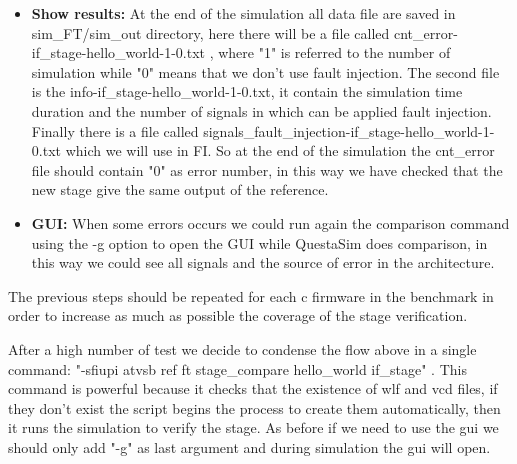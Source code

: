 {{{\begin{itemize}
                To compare the two architecture we should use
                \breakline vsim\_stage\_compare.tcl script (always located in questa directory). This script is the most complex because it contains all code to do comparison, fault injection and data saving. The behaviour is changed using some environmental variables which are set by the comp\_sim script. For the current step we use this script to simulate the new stage using the Reference Inputs as stage stimulus and to compare the simulation outputs with the Reference wlf file, all these operations can be done with the command: \breakline "-b atvsb ref ft stage\_compare hello\_world if\_stage".
                Here comp\_sim use the previous vcd and wlf file created, so if they don't exist we will have some errors.
                
                \item \textbf{Show results:} At the end of the simulation all data file are saved in sim\_FT/sim\_out directory, here there will be a file called cnt\_error-if\_stage-hello\_world-1-0.txt , where "1" is referred to the number of simulation while "0" means that we don't use fault injection. The second file is the info-if\_stage-hello\_world-1-0.txt, it contain the simulation time duration and the number of signals in which can be applied fault injection. Finally there is a file called signals\_fault\_injection-if\_stage-hello\_world-1-0.txt which we will use in FI.
                So at the end of the simulation the cnt\_error file should contain "0" as error number, in this way we have checked that the new stage give the same output of the reference.
            
                \item \textbf{GUI:} When some errors occurs we could run again the comparison command using the -g option to open the GUI while QuestaSim does comparison, in this way we could see all signals and the source of error in the architecture.         
            \end{itemize} 
            
            The previous steps should be repeated for each c firmware in the benchmark in order to increase as much as possible the coverage of the stage verification.
            
            After a high number of test we decide to condense the flow above in a single command: \breakline "-sfiupi atvsb ref ft stage\_compare hello\_world if\_stage" . This command is powerful because it checks that the existence of wlf and vcd files, if they don't exist the script begins the process to create them automatically, then it runs the simulation to verify the stage. 
            As before if we need to use the gui we should only add "-g" as last argument and during simulation the gui will open.
            
}}}
